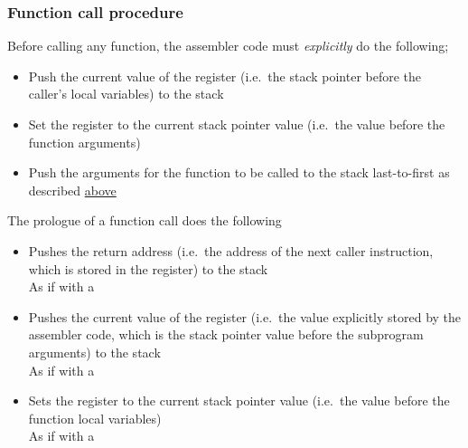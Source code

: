 \hypertarget{functions:call}{
    \subsubsection{Function call procedure}
}

\vspace{-0.2cm}

Before calling any function, the assembler code must \textit{explicitly}
do the following;

\begin{itemize}
    \item Push the current value of the  register
    (i.e.\ the stack pointer before the caller's local variables)
    to the stack \\

    \item Set the  register to the current stack pointer value
    (i.e.\ the value before the function arguments)\\

    \item Push the arguments for the function to be called to the stack
    last-to-first as described \hyperlink{karma:call:basic}{above}

\end{itemize}

The prologue of a function call does the following

\begin{itemize}
    \item Pushes the return address (i.e.\ the address of the next
    caller instruction, which is stored in the  register)
    to the stack \\
    As if with a \hspace{-0.1cm}

    \item Pushes the current value of the  register (i.e.\ the value
    explicitly stored by the assembler code, which is the stack pointer value
    before the subprogram arguments) to the stack \\
    As if with a \hspace{-0.1cm}

    \item Sets the  register to the current stack pointer value
    (i.e.\ the value before the function local variables) \\
    As if with a \hspace{-0.1cm}
\end{itemize}
